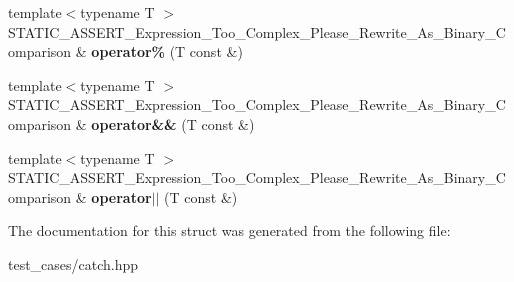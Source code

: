 \begin{DoxyCompactItemize}
\item 
\mbox{\label{structCatch_1_1DecomposedExpression_a6584335aadaee847c9d06ca8f13a4477}} 
{\footnotesize template$<$typename T $>$ }\\S\+T\+A\+T\+I\+C\+\_\+\+A\+S\+S\+E\+R\+T\+\_\+\+Expression\+\_\+\+Too\+\_\+\+Complex\+\_\+\+Please\+\_\+\+Rewrite\+\_\+\+As\+\_\+\+Binary\+\_\+\+Comparison \& {\bfseries operator\%} (T const \&)
\item 
\mbox{\label{structCatch_1_1DecomposedExpression_a14d913535796145b39101a16c0c490da}} 
{\footnotesize template$<$typename T $>$ }\\S\+T\+A\+T\+I\+C\+\_\+\+A\+S\+S\+E\+R\+T\+\_\+\+Expression\+\_\+\+Too\+\_\+\+Complex\+\_\+\+Please\+\_\+\+Rewrite\+\_\+\+As\+\_\+\+Binary\+\_\+\+Comparison \& {\bfseries operator\&\&} (T const \&)
\item 
\mbox{\label{structCatch_1_1DecomposedExpression_ab4800d277290088fea9c594cfdd4f1c7}} 
{\footnotesize template$<$typename T $>$ }\\S\+T\+A\+T\+I\+C\+\_\+\+A\+S\+S\+E\+R\+T\+\_\+\+Expression\+\_\+\+Too\+\_\+\+Complex\+\_\+\+Please\+\_\+\+Rewrite\+\_\+\+As\+\_\+\+Binary\+\_\+\+Comparison \& {\bfseries operator$\vert$$\vert$} (T const \&)
\end{DoxyCompactItemize}


The documentation for this struct was generated from the following file\+:\begin{DoxyCompactItemize}
\item 
test\+\_\+cases/catch.\+hpp\end{DoxyCompactItemize}
